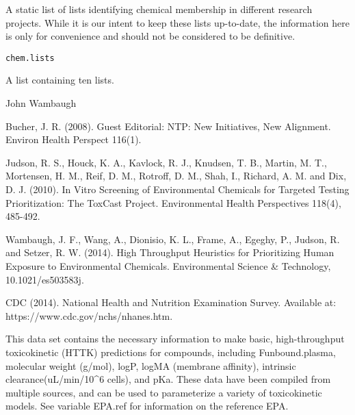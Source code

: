 \documentclass[a4paper]{book}
\begin{document}
%
\begin{Description}\relax
A static list of lists identifying chemical membership in different research
projects. While it is our intent to keep these lists up-to-date, the
information here is only for convenience and should not be considered to be
definitive.
\end{Description}
%
\begin{Usage}
\begin{verbatim}
chem.lists
\end{verbatim}
\end{Usage}
%
\begin{Format}
A list containing ten lists.
\end{Format}
%
\begin{Author}\relax
John Wambaugh
\end{Author}
%
\begin{References}\relax
Bucher, J. R. (2008). Guest Editorial: NTP: New Initiatives, New
Alignment. Environ Health Perspect 116(1).

Judson, R. S., Houck, K. A., Kavlock, R. J., Knudsen, T. B., Martin, M. T.,
Mortensen, H. M., Reif, D. M., Rotroff, D. M., Shah, I., Richard, A. M. and
Dix, D. J. (2010). In Vitro Screening of Environmental Chemicals for
Targeted Testing Prioritization: The ToxCast Project. Environmental Health
Perspectives 118(4), 485-492.

Wambaugh, J. F., Wang, A., Dionisio, K. L., Frame, A., Egeghy, P., Judson,
R. and Setzer, R. W. (2014). High Throughput Heuristics for Prioritizing
Human Exposure to Environmental Chemicals. Environmental Science \&
Technology, 10.1021/es503583j.

CDC (2014). National Health and Nutrition Examination Survey. Available at:
https://www.cdc.gov/nchs/nhanes.htm.
\end{References}
%
\begin{Description}\relax
This data set contains the necessary information to make basic,
high-throughput toxicokinetic (HTTK) predictions for compounds, including
Funbound.plasma, molecular weight (g/mol), logP, logMA (membrane affinity),
intrinsic clearance(uL/min/10\textasciicircum{}6 cells), and pKa. These data have been
compiled from multiple sources, and can be used to parameterize a variety of
toxicokinetic models. See variable EPA.ref for information on the reference EPA.
\end{Description}
\end{document}
